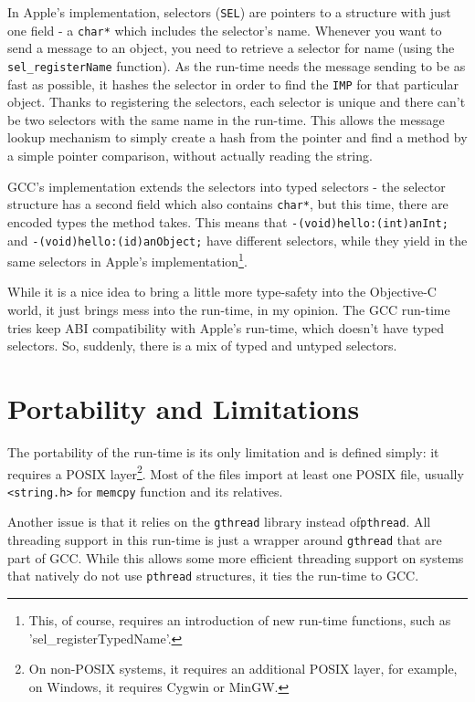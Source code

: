 \documentclass[a4paper, 11pt, fleqn]{book}
\begin{document}
In Apple's implementation, selectors (\verb=SEL=) are pointers to a structure with just one field - a \verb=char*= which includes the selector's name. Whenever you want to send a message to an object, you need to retrieve a selector for name (using the \verb=sel_registerName= function). As the run-time needs the message sending to be as fast as possible, it hashes the selector in order to find the \verb=IMP= for that particular object. Thanks to registering the selectors, each selector is unique and there can't be two selectors with the same name in the run-time. This allows the message lookup mechanism to simply create a hash from the pointer and find a method by a simple pointer comparison, without actually reading the string.

GCC's implementation extends the selectors into typed selectors - the selector structure has a second field which also contains \verb=char*=, but this time, there are encoded types the method takes. This means that \verb=-(void)hello:(int)anInt;= and \verb=-(void)hello:(id)anObject;= have different selectors, while they yield in the same selectors in Apple's implementation\footnote{This, of course, requires an introduction of new run-time functions, such as 'sel\_registerTypedName'.}.

While it is a nice idea to bring a little more type-safety into the Objective-C world, it just brings mess into the run-time, in my opinion. The GCC run-time tries keep ABI compatibility with Apple's run-time, which doesn't have typed selectors. So, suddenly, there is a mix of typed and untyped selectors.

\section{Portability and Limitations}

The portability of the run-time is its only limitation and is defined simply: it requires a POSIX layer\footnote{On non-POSIX systems, it requires an additional POSIX layer, for example, on Windows, it requires Cygwin or MinGW.}. Most of the files import at least one POSIX file, usually \verb=<string.h>= for \verb=memcpy= function and its relatives.

Another issue is that it relies on the \verb=gthread= library instead of\verb=pthread=. All threading support in this run-time is just a wrapper around \verb=gthread= that are part of GCC. While this allows some more efficient threading support on systems that natively do not use \verb=pthread= structures, it ties the run-time to GCC.
\end{document}
